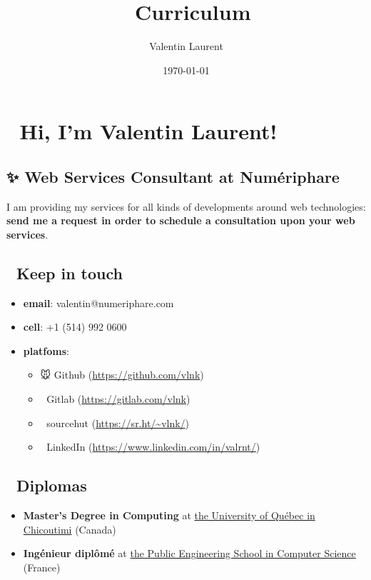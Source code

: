 \documentclass[11pt]{article}
\author{Valentin Laurent}
\date{\today}
\title{👔 Curriculum}
\renewcommand\maketitle{}
\begin{document}
\maketitle
\section{👋 Hi, I'm Valentin Laurent!}
\label{sec:org022ae68}
\subsection{✨ \textbf{Web Services Consultant} at Numériphare}
\label{sec:orga64d0b0}

I am providing my services for all kinds of developments around web technologies: \textbf{send me a request in order to schedule a consultation upon your web services}.

\subsection{📇 Keep in touch}
\label{sec:orga1bb5b5}
\begin{itemize}
\item \textbf{email}: valentin@numeriphare.com
\item \textbf{cell}: +1 (514) 992 0600
\item \textbf{platfoms}:
\begin{itemize}
\item 🐭 Github (\url{https://github.com/vlnk})
\item 🚀 Gitlab (\url{https://gitlab.com/vlnk})
\item 🌲 sourcehut (\url{https://sr.ht/\~vlnk/})
\item 👞 LinkedIn (\url{https://www.linkedin.com/in/valrnt/})
\end{itemize}
\end{itemize}

\subsection{🏫 Diplomas}
\label{sec:orgdab614a}

\begin{itemize}
\item \textbf{Master's Degree in Computing} at \href{https://www.linkedin.com/school/choisiruqac/}{the University of Québec in Chicoutimi} (Canada)
\item \textbf{Ingénieur diplômé} at \href{https://www.linkedin.com/school/isima-clermont-auvergne-inp/}{the Public Engineering School in Computer Science} (France)
\end{itemize}
\end{document}
